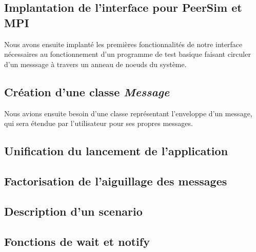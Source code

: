 \documentclass{article}
\begin{document}
			\subsection{Implantation de l'interface pour PeerSim et MPI}
				\large{ Nous avons ensuite implanté les premières fonctionnalités de notre interface nécessaires au fonctionnement d'un programme de test basique faisant circuler d'un messsage à travers un anneau de noeuds du système.}

			\subsection{Création d'une classe \textit{Message}}
				\large{Nous avions ensuite besoin d'une classe représentant l'enveloppe d'un message, qui sera étendue par l'utilisateur pour ses propres messages.}

	\newpage
			\subsection{Unification du lancement de l'application}
				\large{}
			\subsection{Factorisation de l'aiguillage des messages}
				\large{}
			\subsection{Description d'un scenario}
				\large{}
			\subsection{Fonctions de wait et notify}
				\large{}
\end{document}

